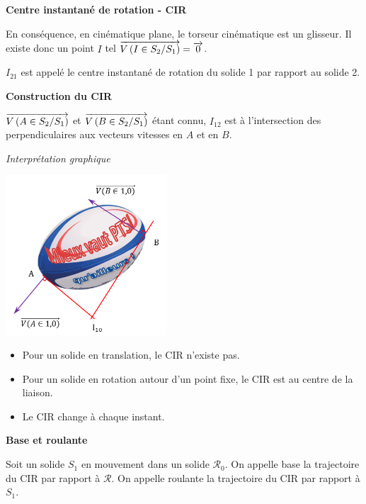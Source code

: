 \documentclass[11pt,oneside]{article}
\begin{document}
\begin{resultat}
\textbf{Centre instantané de rotation - CIR}

En conséquence, en cinématique plane, le torseur cinématique est un glisseur. Il existe donc un point $I$ tel $\overrightarrow{V\left( {I} \in {S_2}/{S_1}\right)}= \overrightarrow{0}$. 

$I_{21}$ est appelé le centre instantané de rotation du solide 1 par rapport au solide 2. 
\end{resultat}

\begin{resultat}
\textbf{Construction du CIR}

$\overrightarrow{V\left( {A} \in {S_2}/{S_1}\right)}$ et $\overrightarrow{V\left( {B} \in {S_2}/{S_1}\right)}$ étant connu, $I_{12}$ est à l'intersection des perpendiculaires aux vecteurs vitesses en $A$ et en $B$.

\end{resultat}

\begin{exemple}
\textit{Interprétation graphique}

\begin{center}
\includegraphics[width=6cm]{png/ballon2}
\end{center}
\end{exemple}



\begin{rem}
\begin{itemize}
\item Pour un solide en translation, le CIR n'existe pas.
\item Pour un solide en rotation autour d'un point fixe, le CIR est au centre de la liaison.
\item Le CIR change à chaque instant.
\end{itemize}
\end{rem}

\begin{defi}
\textbf{Base et roulante}

Soit un solide $S_1$ en mouvement dans un solide $\mathcal{R}_0$. On appelle base la trajectoire du CIR par rapport à $\mathcal{R}$. On appelle roulante la trajectoire du CIR par rapport à $S_1$.
\end{defi}
\end{document}
